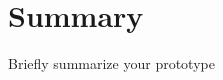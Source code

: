 \documentclass[
10pt, %
a4paper, %
oneside, %
headinclude,footinclude, %
BCOR5mm, %
]{scrartcl}
\title{\spacedallcaps{Distance Based Application Trigger}} %
\author{\small{Mehdi Yosofie, Philipp Schlieker}} %
\date{\today} %
\begin{document}

\renewcommand{\sectionmark}[1]{\markright{\spacedlowsmallcaps{#1}}} %
\lehead{\mbox{\llap{\small\thepage\kern1em\color{halfgray} \vline}\color{halfgray}\hspace{0.5em}\rightmark\hfil}} %

\pagestyle{scrheadings} %


\maketitle %

\setcounter{tocdepth}{2} %

\tableofcontents %




\section*{Summary} %

Briefly summarize your prototype

\end{document}

